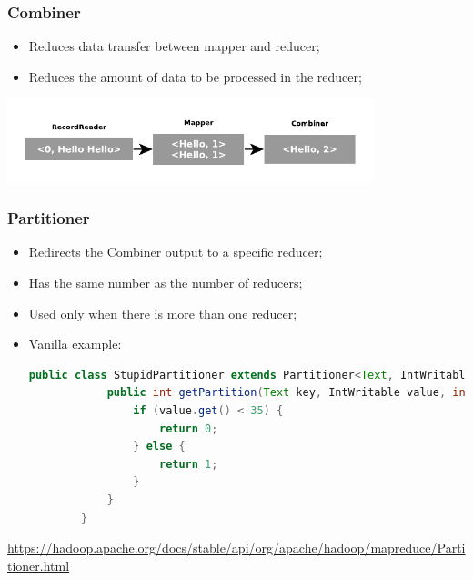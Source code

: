 \documentclass[aspectratio=169]{beamer}
\begin{document}
\begin{frame}
	\frametitle{Combiner}

	\begin{itemize}
		\item Reduces data transfer between mapper and reducer;
		\item Reduces the amount of data to be processed in the reducer;
	\end{itemize}

	\begin{center}
		\includegraphics[height=1\textheight,width=0.8\textwidth,keepaspectratio]{./images/combiner.pdf}
	\end{center}
\end{frame}

\begin{frame}[fragile]
	\frametitle{Partitioner}

	\begin{itemize}
		\item Redirects the Combiner output to a specific reducer;
		\item Has the same number as the number of reducers;
		\item Used only when there is more than one reducer;
		\item Vanilla example:
		      \begin{lstlisting}[language=java,basicstyle=\tiny,columns=fullflexible]
        public class StupidPartitioner extends Partitioner<Text, IntWritable> {
            public int getPartition(Text key, IntWritable value, int numPartitions) {
                if (value.get() < 35) {
                    return 0;
                } else {
                    return 1;
                }
            }
        }
            \end{lstlisting}
	\end{itemize}

	\begin{center}
		{\tiny \href{https://hadoop.apache.org/docs/stable/api/org/apache/hadoop/mapreduce/Partitioner.html}{https://hadoop.apache.org/docs/stable/api/org/apache/hadoop/mapreduce/Partitioner.html}}
	\end{center}
\end{frame}
\end{document}

